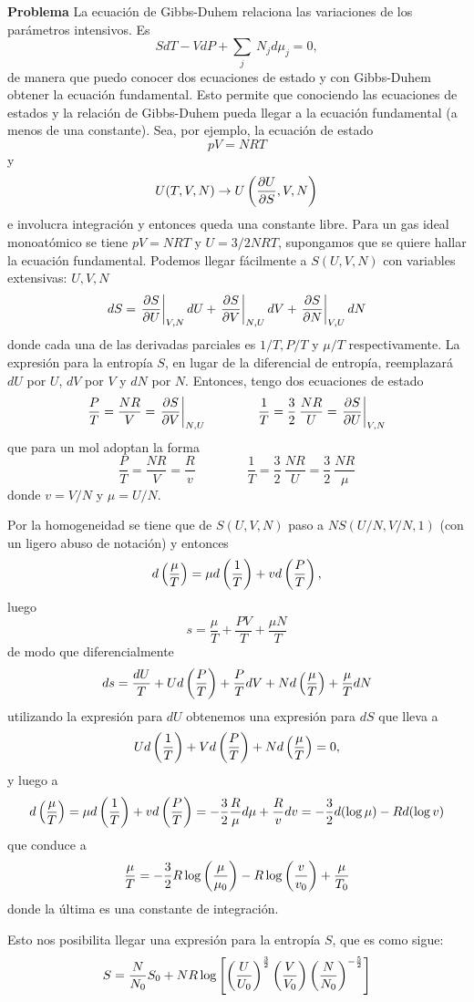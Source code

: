 \documentclass[10pt,oneside]{CBFT_book}
\begin{document}
\begin{ejemplo}{\bf Problema}
La ecuación de Gibbs-Duhem relaciona las variaciones de los parámetros intensivos. Es
\[
	S dT - V dP + \sum_{j} \: N_j d\mu_j = 0,
\]
de manera que puedo conocer dos ecuaciones de estado y con Gibbs-Duhem obtener la ecuación fundamental.
Esto permite que conociendo las ecuaciones de estados y la relación de Gibbs-Duhem pueda llegar a la
ecuación fundamental (a menos de una constante).
Sea, por ejemplo, la ecuación de estado
\[
	p V = NRT
\]
y
\[
	U(T,V,N) \to U\left( \frac{\partial^{\hspace{-0.05em}} {U}}{\partial {S}^{\hspace{-0.05em}}}, V, N \right)
\]
e involucra integración y entonces queda una constante libre.
Para un gas ideal monoatómico se tiene $pV = NRT$ y $U = 3/2 NRT$, supongamos que se quiere hallar la
ecuación fundamental.
Podemos llegar fácilmente a $S(U,V,N)$ con variables extensivas: $U, V, N$
\[
	dS = \left.\frac{\partial^{\hspace{-0.05em}} {S}}{\partial {U}^{\hspace{-0.05em}}}\right|_{V,N} dU + \left.\frac{\partial^{\hspace{-0.05em}} {S}}{\partial {V}^{\hspace{-0.05em}}}\right|_{N,U} dV + \left.\frac{\partial^{\hspace{-0.05em}} {S}}{\partial {N}^{\hspace{-0.05em}}}\right|_{V,U} dN
\]
donde cada una de las derivadas parciales es $1/T, P/T$ y $\mu/T$ respectivamente.
La expresión para la entropía $S$, en lugar de la diferencial de entropía, reemplazará $dU$ por $U$, $dV$
por $V$ y $dN$ por $N$. 
Entonces, tengo dos ecuaciones de estado
\[
	\frac{P}{T} = \frac{NR}{V} = \left.\frac{\partial^{\hspace{-0.05em}} {S}}{\partial {V}^{\hspace{-0.05em}}}\right|_{N,U} \qquad \qquad 
	\frac{1}{T} = \frac{3}{2} \: \frac{NR}{U} = \left.\frac{\partial^{\hspace{-0.05em}} {S}}{\partial {U}^{\hspace{-0.05em}}}\right|_{V,N}
\]
que para un mol adoptan la forma
\[
	\frac{P}{T} = \frac{NR}{V} = \frac{R}{v}  \qquad \qquad 
	\frac{1}{T} = \frac{3}{2} \: \frac{NR}{U} =  \frac{3}{2} \: \frac{NR}{\mu}
\]
donde $v = V/N$ y $\mu = U/N$.

Por la homogeneidad se tiene que de $S(U,V,N)$ paso a $NS(U/N,V/N,1)$ (con un ligero abuso de notación) y
entonces
\[
	d \left( \frac{ \mu }{ T } \right) = \mu d\left( \frac{ 1 }{ T } \right) + v d\left( \frac{ P }{ T } \right),
\]
luego 
\[
	s = \frac{\mu}{T} + \frac{PV}{T} + \frac{\mu N}{T}
\]
de modo que diferencialmente
\[
	ds = \frac{dU}{T} + U d\left( \frac{ P }{ T } \right) + \frac{P}{T}dV + N d\left( \frac{ \mu }{ T } \right) + \frac{\mu}{T} dN
\]
utilizando la expresión para $dU$ obtenemos una expresión para $dS$ que lleva a
\[
	 U d\left( \frac{ 1 }{ T } \right) + V d\left( \frac{ P }{ T } \right) + N d\left( \frac{ \mu }{ T } \right) = 0,
\]
y luego a 
\[
	d\left( \frac{ \mu }{ T } \right) = \mu d\left( \frac{ 1 }{ T } \right) + v d\left( \frac{ P }{ T } \right) = 
	-\frac{3}{2} \frac{R}{\mu} d\mu + \frac{R}{v} dv =
	- \frac{3}{2} d( \log \mu) - R d( \log v )
\]
que conduce a
\[
	\frac{\mu}{T} = -  \frac{3}{2} R \log \left( \frac{ \mu }{ \mu_0 } \right) 
	- R \log \left( \frac{ v }{ v_0 } \right) + \frac{ \mu }{ T_0 }
\]
donde la última es una constante de integración.

Esto nos posibilita llegar una expresión para la entropía $S$, que es como sigue:
\[
	S = \frac{N}{N_0} S_0 + N R \log \left[ \left( \frac{ U }{ U_0 } \right)^{\frac{3}{2}} 
	\left( \frac{ V }{ V_0 } \right) \left( \frac{ N }{ N_0 } \right)^{-\frac{5}{2}} \right]
\]
 
\end{ejemplo}
\end{document}
